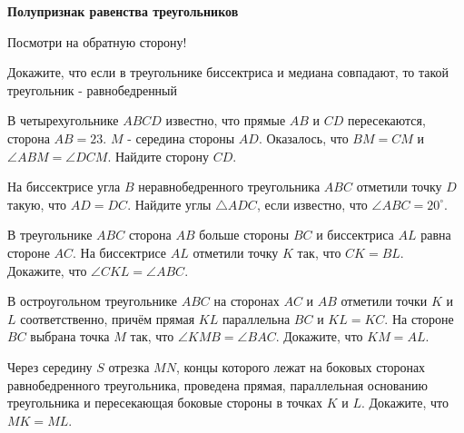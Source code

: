 \centerline{\bf \Huge Полупризнак равенства треугольников}

\begin{flushright}
        \scriptsize{Посмотри на обратную сторону!}
\end{flushright}

 Докажите, что если в треугольнике биссектриса и медиана совпадают, то такой треугольник - равнобедренный

 В четырехугольнике $ABCD$ известно, что прямые $AB$ и $CD$ пересекаются, сторона $AB=23$. $M$ - середина стороны $AD$. Оказалось, что $BM=CM$ и $\angle ABM = \angle DCM$. Найдите сторону $CD$.


 На биссектрисе угла $B$ неравнобедренного треугольника $ABC$ отметили точку $D$ такую, что $AD = DC$. Найдите углы  $\triangle ADC$, если известно, что $\angle ABC = 20^{\circ}$.


 В треугольнике $ABC$ сторона $AB$ больше стороны $BC$ и биссектриса $AL$ равна стороне $AC$. На биссектрисе $AL$ отметили точку $K$ так, что $CK=BL$. Докажите, что $\angle CKL = \angle ABC$.

 В остроугольном треугольнике $ABC$ на сторонах $AC$ и $AB$ отметили точки $K$ и $L$ соответственно, причём прямая $KL$ параллельна $BC$ и $KL = KC$.  На стороне $BC$ выбрана точка $M$ так, что  $\angle KMB = \angle BAC$.  Докажите, что  $KM = AL$.


 Через середину $S$ отрезка $MN$, концы которого лежат на боковых сторонах равнобедренного треугольника, проведена прямая, параллельная основанию треугольника и пересекающая боковые стороны в точках $K$ и $L$. Докажите, что $MK = ML$.


\newpage

\hspace{3mm}

